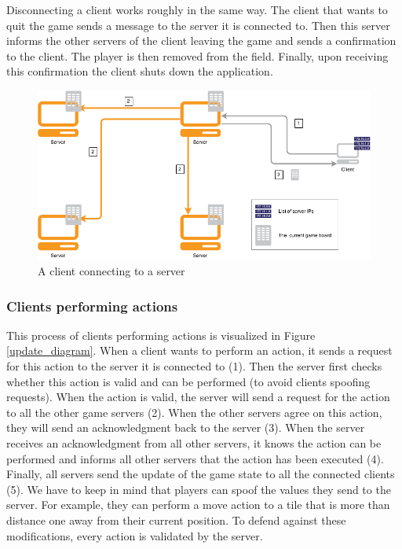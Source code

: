 Disconnecting a client works roughly in the same way. The client that wants to quit the game sends a message to the server it is connected to. Then this server informs the other servers of the client leaving the game and sends a confirmation to the client. The player is then removed from the field. Finally, upon receiving this confirmation the client shuts down the application.

\begin{figure}[h!]
  \centering
    \includegraphics[width=\textwidth]{diagrams/connecting-client}
    
  \caption{A client connecting to a server}
  \label{connect_diagram}
\end{figure}

\subsubsection{Clients performing actions}
\label{sec:clients_actions}
This process of clients performing actions is visualized in Figure \ref{update_diagram}. When a client wants to perform an action, it sends a request for this action to the server it is connected to (1). Then the server first checks whether this action is valid and can be performed (to avoid clients spoofing requests). When the action is valid, the server will send a request for the action to all the other game servers (2). When the other servers agree on this action, they will send an acknowledgment back to the server (3). When the server receives an acknowledgment from all other servers, it knows the action can be performed and informs all other servers that the action has been executed (4). Finally, all servers send the update of the game state to all the connected clients (5). We have to keep in mind that players can spoof the values they send to the server. For example, they can perform a move action to a tile that is more than distance one away from their current position. To defend against these modifications, every action is validated by the server.

